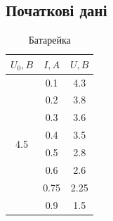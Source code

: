 \documentclass[a4paper,12pt]{article}
\begin{document}
\newpage
	\recalctypearea
	\begin{center}
		\subsection*{\LARGE{Початкові дані}}
	\end{center}
	\begin{table}[htbp]
		\centering
		\caption{Батарейка}
		\begin{tabular}{|c|c|c|}
			\hline
			\textbf{$U_0, B$}    & \textbf{$I, A$} & \textbf{$U, B$} \\ \hline
			\multirow{8}{*}{4.5} & 0.1             & 4.3             \\ \cline{2-3} 
			& 0.2             & 3.8             \\ \cline{2-3} 
			& 0.3             & 3.6             \\ \cline{2-3} 
			& 0.4             & 3.5             \\ \cline{2-3} 
			& 0.5             & 2.8             \\ \cline{2-3} 
			& 0.6             & 2.6             \\ \cline{2-3} 
			& 0.75            & 2.25            \\ \cline{2-3} 
			& 0.9             & 1.5             \\ \hline
		\end{tabular}
	\end{table}
	
\end{document}
